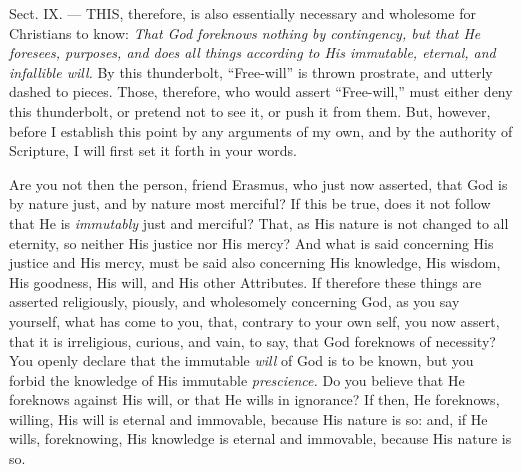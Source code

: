 
Sect. IX. — THIS, therefore, is also essentially necessary and wholesome for Christians to know: \emph{That God foreknows nothing by contingency, but that He foresees, purposes, and does all things according to His immutable, eternal, and infallible will. }By this thunderbolt, “Free-will” is thrown prostrate, and utterly dashed to pieces. Those, therefore, who would assert “Free-will,” must either deny this thunderbolt, or pretend not to see it, or push it from them. But, however, before I establish this point by any arguments of my own, and by the authority of Scripture, I will first set it forth in your words.

Are you not then the person, friend Erasmus, who just now asserted, that God is by nature just, and by nature most merciful? If this be true, does it not follow that He is \emph{immutably }just and merciful? That, as His nature is not changed to all eternity, so neither His justice nor His mercy? And what is said concerning His justice and His mercy, must be said also concerning His knowledge, His wisdom, His goodness, His will, and His other Attributes. If therefore these things are asserted religiously, piously, and wholesomely concerning God, as you say yourself, what has come to you, that, contrary to your own self, you now assert, that it is irreligious, curious, and vain, to say, that God foreknows of necessity? You openly declare that the immutable \emph{will }of God is to be known, but you forbid the knowledge of His immutable \emph{prescience. }Do you believe that He foreknows against His will, or that He wills in ignorance? If then, He foreknows, willing, His will is eternal and immovable, because His nature is so: and, if He wills, foreknowing, His knowledge is eternal and immovable, because His nature is so.

